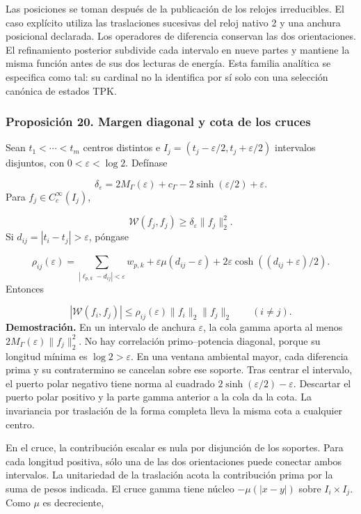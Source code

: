 Las posiciones se toman después de la publicación de los relojes irreducibles. El caso explícito utiliza las traslaciones sucesivas del reloj nativo 2 y una anchura posicional declarada. Los operadores de diferencia conservan las dos orientaciones. El refinamiento posterior subdivide cada intervalo en nueve partes y mantiene la misma función antes de sus dos lecturas de energía. Esta familia analítica se especifica como tal: su cardinal no la identifica por sí solo con una selección canónica de estados TPK.

\subsubsection*{Proposición 20. Margen diagonal y cota de los cruces}
Sean \(t_1<\cdots<t_m\) centros distintos e \(I_j=(t_j-\varepsilon/2,t_j+\varepsilon/2)\) intervalos disjuntos, con \(0<\varepsilon<\log2\). Defínase

\[
\delta_\varepsilon=2M_\Gamma(\varepsilon)+c_\Gamma
-2\sinh(\varepsilon/2)+\varepsilon.
\]
Para \(f_j\in C_c^\infty(I_j)\),

\[
\mathscr W(f_j,f_j)\geq\delta_\varepsilon\|f_j\|_2^2.
\]
Si \(d_{ij}=|t_i-t_j|>\varepsilon\), póngase

\[
\rho_{ij}(\varepsilon)=
\sum_{|\ell_{p,k}-d_{ij}|<\varepsilon}w_{p,k}
+\varepsilon\mu(d_{ij}-\varepsilon)
+2\varepsilon\cosh((d_{ij}+\varepsilon)/2).
\]
Entonces

\[
|\mathscr W(f_i,f_j)|
\leq\rho_{ij}(\varepsilon)\|f_i\|_2\|f_j\|_2
\qquad(i\neq j).
\]
\textbf{Demostración.} En un intervalo de anchura \(\varepsilon\), la cola gamma aporta al menos \(2M_\Gamma(\varepsilon)\|f_j\|_2^2\). No hay correlación primo–potencia diagonal, porque su longitud mínima es \(\log2>\varepsilon\). En una ventana ambiental mayor, cada diferencia prima y su contratermino se cancelan sobre ese soporte. Tras centrar el intervalo, el puerto polar negativo tiene norma al cuadrado \(2\sinh(\varepsilon/2)-\varepsilon\). Descartar el puerto polar positivo y la parte gamma anterior a la cola da la cota. La invariancia por traslación de la forma completa lleva la misma cota a cualquier centro.

En el cruce, la contribución escalar es nula por disjunción de los soportes. Para cada longitud positiva, sólo una de las dos orientaciones puede conectar ambos intervalos. La unitariedad de la traslación acota la contribución prima por la suma de pesos indicada. El cruce gamma tiene núcleo \(-\mu(|x-y|)\) sobre \(I_i\times I_j\). Como \(\mu\) es decreciente,

